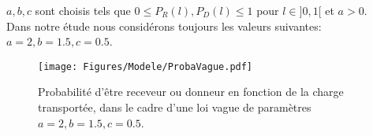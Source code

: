 $a, b, c$ sont choisis tels que $0\leq P_R(l), P_D(l) \leq 1$ pour $l\in]0,1[$ et $a>0$.\\

Dans notre étude nous considérons toujours les valeurs suivantes: $a=2, b=1.5, c=0.5$.

\begin{figure}[h]
\centering
\texttt{[image: Figures/Modele/ProbaVague.pdf]}
\caption{Probabilité d'être receveur ou donneur en fonction de la charge transportée, dans le cadre d'une loi vague de paramètres $a=2, b=1.5, c=0.5$.}
\label{ProbaVague}
\end{figure}
